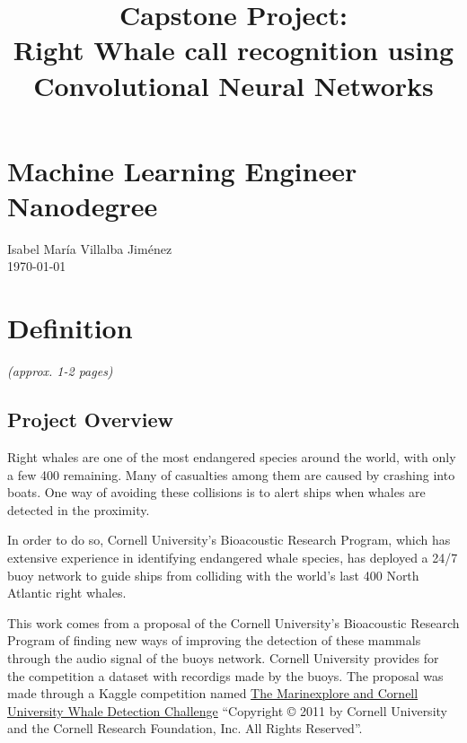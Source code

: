 \documentclass[]{article}
\author{}
\date{}
\title{Capstone Project: \\ Right Whale call recognition using \\ Convolutional Neural Networks}\label{capstone-project}
\newcommand{\competition}{The Marinexplore and Cornell University Whale Detection Challenge}
\newcommand{\copyrighting}{“Copyright © 2011 by Cornell University and the Cornell Research Foundation, Inc. All Rights Reserved”}
\begin{document}
\maketitle

\section*{Machine Learning Engineer Nanodegree}\label{machine-learning-engineer-nanodegree}

Isabel María Villalba Jiménez \\ \today

\section{Definition}\label{i.-definition}

\emph{(approx. 1-2 pages)}

\subsection{Project Overview}\label{project-overview}


Right whales are one of the most endangered species around the world, with only a few 400 remaining. Many of casualties among them are caused by crashing into boats. One way of avoiding these collisions is to alert ships when whales are detected in the proximity.

In order to do so, Cornell University's Bioacoustic Research Program, which has extensive experience in identifying endangered whale species, has deployed a 24/7 buoy network to guide ships from colliding with the world's last 400 North Atlantic right whales.

This work comes from a proposal of the Cornell University's Bioacoustic Research Program of finding new ways of improving the detection of these mammals through the audio signal of the buoys network.  Cornell University provides for the competition a dataset with recordigs made by the buoys. The proposal was made through a Kaggle competition named \href{https://www.kaggle.com/c/whale-detection-challenge}{\competition} \cite{kagglewhale} \copyrighting.
\end{document}
